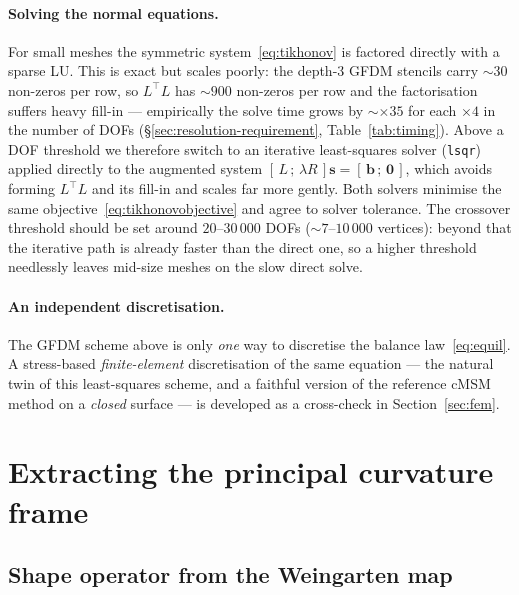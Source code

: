 \documentclass[11pt]{article}
\newcommand{\vv}[1]{\bm{#1}}          %
\begin{document}
\paragraph{Solving the normal equations.}
For small meshes the symmetric system~\eqref{eq:tikhonov} is factored
directly with a sparse LU.  This is exact but scales poorly: the depth-3
GFDM stencils carry ${\sim}30$ non-zeros per row, so $L^\top L$ has
${\sim}900$ non-zeros per row and the factorisation suffers heavy fill-in
— empirically the solve time grows by ${\sim}\times35$ for each
${\times}4$ in the number of DOFs (\S\ref{sec:resolution-requirement},
Table~\ref{tab:timing}).  Above a DOF threshold we therefore switch to an
iterative least-squares solver (\texttt{lsqr}) applied directly to the
augmented system $[\,L\,;\,\lambda R\,]\vv{s}=[\,\vv{b}\,;\,\vv{0}\,]$,
which avoids forming $L^\top L$ and its fill-in and scales far more
gently.  Both solvers minimise the same objective~\eqref{eq:tikhonovobjective}
and agree to solver tolerance.  The crossover threshold should be set
around $20$--$30\,000$ DOFs (${\sim}7$--$10\,000$ vertices): beyond that
the iterative path is already faster than the direct one, so a higher
threshold needlessly leaves mid-size meshes on the slow direct solve.

\paragraph{An independent discretisation.}  The GFDM scheme above is only
\emph{one} way to discretise the balance law~\eqref{eq:equil}.  A stress-based
\emph{finite-element} discretisation of the same equation --- the natural twin of
this least-squares scheme, and a faithful version of the reference cMSM method on
a \emph{closed} surface --- is developed as a cross-check in
Section~\ref{sec:fem}.

\section{Extracting the principal curvature frame}
\label{sec:pc-frame}

\subsection{Shape operator from the Weingarten map}
\end{document}
